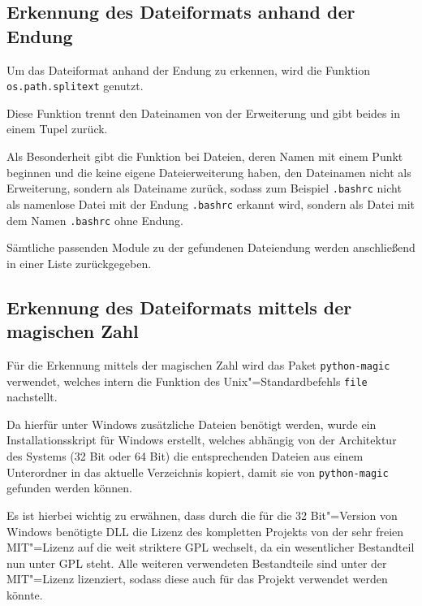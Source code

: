         \subsection{Erkennung des Dateiformats anhand der Endung}
            Um das Dateiformat anhand der Endung zu erkennen,
            wird die Funktion
            \lstinline{os.path.splitext} genutzt.

            Diese Funktion trennt den Dateinamen von der Erweiterung und
            gibt beides in einem Tupel zurück.

            Als Besonderheit gibt die Funktion bei Dateien,
            deren Namen mit einem Punkt beginnen und
            die keine eigene Dateierweiterung haben,
            den Dateinamen nicht als Erweiterung,
            sondern als Dateiname zurück,
            sodass zum Beispiel
            \lstinline{.bashrc} nicht als namenlose Datei mit der Endung
            \lstinline{.bashrc} erkannt wird,
            sondern als Datei mit dem Namen
            \lstinline{.bashrc} ohne Endung.

            Sämtliche passenden Module zu der gefundenen Dateiendung werden anschließend in einer Liste zurückgegeben.

        \subsection{Erkennung des Dateiformats mittels der magischen Zahl}
            Für die Erkennung mittels der magischen Zahl wird das Paket
            \lstinline{python-magic} verwendet,
            welches intern die Funktion des Unix"=Standardbefehls
            \lstinline{file} nachstellt.

            Da hierfür unter Windows zusätzliche Dateien benötigt werden,
            wurde ein Installationsskript für Windows erstellt,
            welches abhängig von der Architektur des Systems
            (32 Bit oder
            64 Bit) die entsprechenden Dateien aus einem Unterordner in das aktuelle Verzeichnis kopiert,
            damit sie von
            \lstinline{python-magic} gefunden werden können.

            Es ist hierbei wichtig zu erwähnen,
            dass durch die für die 32 Bit"=Version von Windows benötigte
            \gls{DLL} die Lizenz des kompletten Projekts von der sehr freien
            \gls{MIT}"=Lizenz auf die weit striktere
            \gls{GPL} wechselt,
            da ein wesentlicher Bestandteil nun unter
            \gls{GPL} steht.
            Alle weiteren verwendeten Bestandteile sind unter der
            \gls{MIT}"=Lizenz lizenziert,
            sodass diese auch für das Projekt verwendet werden könnte.

